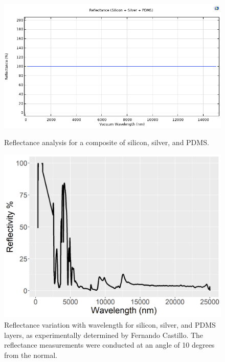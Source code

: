 \begin{figure}[H]
  \centering
  \begin{minipage}{0.48\textwidth}
    \centering
    \includegraphics[width=\textwidth]{Chapters/Figures/Chapter 4 Figures/Si+Ag+PDMS (Final Result).png}
    \caption{Reflectance analysis for a composite of silicon, silver, and PDMS.}
    \label{fig:Reflectance-Si-Ag-PDMS-Final}
  \end{minipage}\hfill
  \begin{minipage}{0.48\textwidth}
    \centering
    \includegraphics[width=\textwidth]{Chapters/Figures/Chapter 4 Figures/Si+Ag+PDMS (Fernando's Results).png}
    \caption{Reflectance variation with wavelength for silicon, silver, and PDMS layers, as experimentally determined by Fernando Castillo. The reflectance measurements were conducted at an angle of 10 degrees from the normal.}
    \label{fig:Reflectance-Si-Ag-PDMS-Fernando}
  \end{minipage}
\end{figure}


